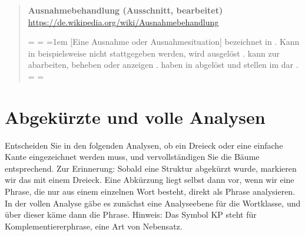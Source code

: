 \begin{quote}\onehalfspacing
   \textbf{Ausnahmebehandlung (Ausschnitt, bearbeitet)}\\
   {\footnotesize\url{https://de.wikipedia.org/wiki/Ausnahmebehandlung}}\\
  \begin{linenumbers}
  \newdimen\origiwspc%
  \newdimen\origiwstr%
  \origiwspc=\font
  \origiwstr=\font
  \font=1em
  {[Eine Ausnahme oder Ausnahmesituation]} bezeichnet in   .
  Kann in  beispielsweise  nicht stattgegeben werden, wird  ausgelöst .
   kann zur   abarbeiten,   beheben oder anzeigen .
   haben in   abgelöst und stellen im   dar .
  \font=\origiwspc
  \font=\origiwstr
  \end{linenumbers}
\end{quote}

\Halbzeile



\section{Abgekürzte und volle Analysen}

Entscheiden Sie in den folgenden Analysen, ob ein Dreieck oder eine einfache Kante eingezeichnet werden muss, und vervollständigen Sie die Bäume entsprechend.
Zur Erinnerung: Sobald eine Struktur abgekürzt wurde, markieren wir das mit einem Dreieck.
Eine Abkürzung liegt selbst dann vor, wenn wir eine Phrase, die nur aus einem einzelnen Wort besteht, direkt als Phrase analysieren.
In der vollen Analyse gäbe es zunächst eine Analyseebene für die Wortklasse, und über dieser käme dann die Phrase.
Hinweis: Das Symbol KP steht für Komplementiererphrase, eine Art von Nebensatz.

